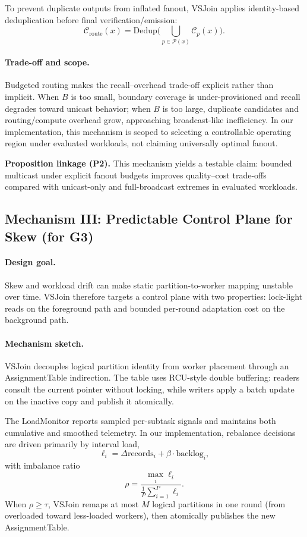 To prevent duplicate outputs from inflated fanout, VSJoin applies identity-based deduplication before final verification/emission:
\[
\mathcal{C}_{\mathrm{route}}(x)=\mathrm{Dedup}\Big(\bigcup_{p\in \mathcal{P}(x)} \mathcal{C}_p(x)\Big).
\]

\paragraph{Trade-off and scope.}
Budgeted routing makes the recall--overhead trade-off explicit rather than implicit. When $B$ is too small, boundary coverage is under-provisioned and recall degrades toward unicast behavior; when $B$ is too large, duplicate candidates and routing/compute overhead grow, approaching broadcast-like inefficiency. In our implementation, this mechanism is scoped to selecting a controllable operating region under evaluated workloads, not claiming universally optimal fanout.

\noindent\textbf{Proposition linkage (P2).}
This mechanism yields a testable claim: bounded multicast under explicit fanout budgets improves quality--cost trade-offs compared with unicast-only and full-broadcast extremes in evaluated workloads.

\subsection{Mechanism III: Predictable Control Plane for Skew (for G3)}

\paragraph{Design goal.}
Skew and workload drift can make static partition-to-worker mapping unstable over time. VSJoin therefore targets a control plane with two properties: lock-light reads on the foreground path and bounded per-round adaptation cost on the background path.

\paragraph{Mechanism sketch.}
VSJoin decouples logical partition identity from worker placement through an AssignmentTable indirection. The table uses RCU-style double buffering: readers consult the current pointer without locking, while writers apply a batch update on the inactive copy and publish it atomically.

The LoadMonitor reports sampled per-subtask signals and maintains both cumulative and smoothed telemetry. In our implementation, rebalance decisions are driven primarily by interval load,
\[
\ell_i = \Delta \mathrm{records}_i + \beta \cdot \mathrm{backlog}_i,
\]
with imbalance ratio
\[
\rho = \frac{\max_i \ell_i}{\frac{1}{P}\sum_{i=1}^{P} \ell_i}.
\]
When $\rho \ge \tau$, VSJoin remaps at most $M$ logical partitions in one round (from overloaded toward less-loaded workers), then atomically publishes the new AssignmentTable.

